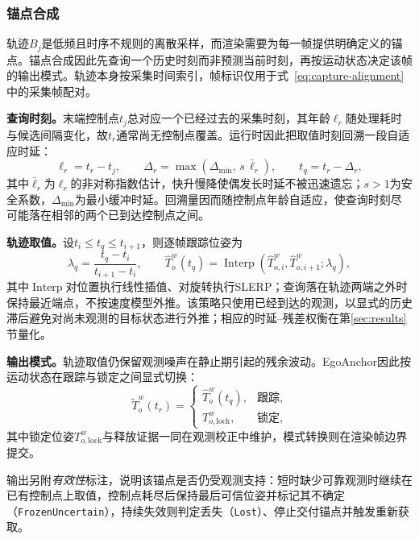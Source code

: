 \documentclass[review]{vgtc}
\begin{document}
\subsubsection{锚点合成}\label{sec:frame-output}

轨迹$B_j$是低频且时序不规则的离散采样，而渲染需要为每一帧提供明确定义的锚点。锚点合成因此先查询一个历史时刻而非预测当前时刻，再按运动状态决定该帧的输出模式。轨迹本身按采集时间索引，帧标识仅用于式~\eqref{eq:capture-alignment}中的采集帧配对。

\textbf{查询时刻。}末端控制点$t_j$总对应一个已经过去的采集时刻，其年龄$\ell_r$随处理耗时与候选间隔变化，故$t_r$通常尚无控制点覆盖。运行时因此把取值时刻回溯一段自适应时延：
\begin{equation}
\ell_r = t_r - t_j, \qquad \Delta_r = \max(\Delta_{\min},\, s\,\bar{\ell}_r), \qquad t_q = t_r - \Delta_r,
\label{eq:target-time}
\end{equation}
其中$\bar{\ell}_r$为$\ell_r$的非对称指数估计，快升慢降使偶发长时延不被迅速遗忘；$s>1$为安全系数，$\Delta_{\min}$为最小缓冲时延。回溯量因而随控制点年龄自适应，使查询时刻尽可能落在相邻的两个已到达控制点之间。

\textbf{轨迹取值。}设$t_i \leq t_q \leq t_{i+1}$，则逐帧跟踪位姿为
\begin{equation}
\lambda_q = \frac{t_q - t_i}{t_{i+1} - t_i}, \qquad \widehat{T}_o^w(t_q) = \operatorname{Interp}(\widehat{T}_{o,i}^{w}, \widehat{T}_{o,i+1}^{w}; \lambda_q),
\label{eq:delayed-interp}
\end{equation}
其中$\operatorname{Interp}$对位置执行线性插值、对旋转执行SLERP；查询落在轨迹两端之外时保持最近端点，不按速度模型外推。该策略只使用已经到达的观测，以显式的历史滞后避免对尚未观测的目标状态进行外推；相应的时延--残差权衡在第\ref{sec:results}节量化。

\textbf{输出模式。}轨迹取值仍保留观测噪声在静止期引起的残余波动。EgoAnchor因此按运动状态在跟踪与锁定之间显式切换：
\begin{equation}
\widetilde{T}_o^w(t_r) = \begin{cases}
\widehat{T}_o^w(t_q), & \text{跟踪}, \\
T_{o,\mathrm{lock}}^w, & \text{锁定},
\end{cases}
\label{eq:staticlock}
\end{equation}
其中锁定位姿$T_{o,\mathrm{lock}}^w$与释放证据一同在观测校正中维护，模式转换则在渲染帧边界提交。

输出另附\emph{有效性}标注，说明该锚点是否仍受观测支持：短时缺少可靠观测时继续在已有控制点上取值，控制点耗尽后保持最后可信位姿并标记其不确定（\texttt{FrozenUncertain}），持续失效则判定丢失（\texttt{Lost}）、停止交付锚点并触发重新获取。
\end{document}
